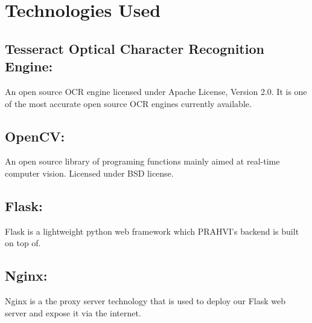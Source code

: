 \chapter{Technologies Used}



\section{Tesseract Optical Character Recognition Engine:}
An open source OCR engine licensed under Apache License, Version 2.0\footnotemark. It is one of the most accurate open source OCR engines currently available.




\section{OpenCV:}
An open source library of programing functions mainly aimed at real-time computer vision. Licensed under BSD license\footnotemark.

\section{Flask:}
Flask is a lightweight python web framework which PRAHVI's backend is built on top of.

\section{Nginx:}
Nginx is a the proxy server technology that is used to deploy our Flask web server and expose it via the internet.







